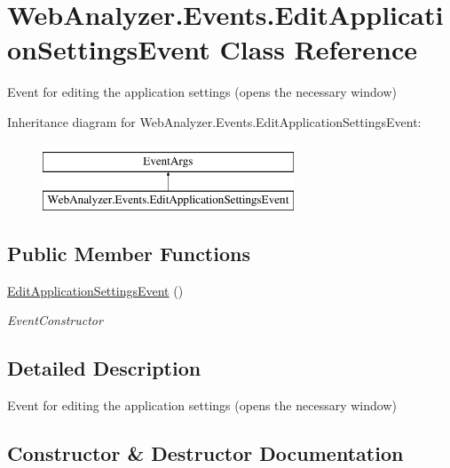 \hypertarget{class_web_analyzer_1_1_events_1_1_edit_application_settings_event}{}\section{Web\+Analyzer.\+Events.\+Edit\+Application\+Settings\+Event Class Reference}
\label{class_web_analyzer_1_1_events_1_1_edit_application_settings_event}


Event for editing the application settings (opens the necessary window)  


Inheritance diagram for Web\+Analyzer.\+Events.\+Edit\+Application\+Settings\+Event\+:\begin{figure}[H]
\begin{center}
\leavevmode
\includegraphics[height=2.000000cm]{class_web_analyzer_1_1_events_1_1_edit_application_settings_event}
\end{center}
\end{figure}
\subsection*{Public Member Functions}
\begin{DoxyCompactItemize}
\item 
\hyperlink{class_web_analyzer_1_1_events_1_1_edit_application_settings_event_a33e4e8f517afd07a2ecff7cce1471acd}{Edit\+Application\+Settings\+Event} ()
\begin{DoxyCompactList}\small\item\em Event\+Constructor \end{DoxyCompactList}\end{DoxyCompactItemize}


\subsection{Detailed Description}
Event for editing the application settings (opens the necessary window) 



\subsection{Constructor \& Destructor Documentation}
\hypertarget{class_web_analyzer_1_1_events_1_1_edit_application_settings_event_a33e4e8f517afd07a2ecff7cce1471acd}{}

